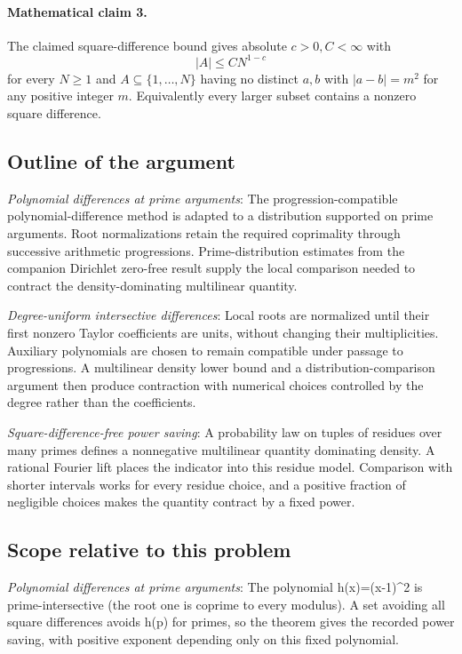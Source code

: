 \documentclass[11pt]{article}
\begin{document}
\paragraph{Mathematical claim 3.} The claimed square-difference bound gives absolute $c>0,C<\infty$ with \[|A|\le CN^{1-c}\] for every $N\ge1$ and $A\subseteq\{1,\ldots,N\}$ having no distinct $a,b$ with $|a-b|=m^2$ for any positive integer $m$. Equivalently every larger subset contains a nonzero square difference.

\subsection{Outline of the argument}
\textit{Polynomial differences at prime arguments}: The progression-compatible polynomial-difference method is adapted to a distribution supported on prime arguments. Root normalizations retain the required coprimality through successive arithmetic progressions. Prime-distribution estimates from the companion Dirichlet zero-free result supply the local comparison needed to contract the density-dominating multilinear quantity.

\textit{Degree-uniform intersective differences}: Local roots are normalized until their first nonzero Taylor coefficients are units, without changing their multiplicities. Auxiliary polynomials are chosen to remain compatible under passage to progressions. A multilinear density lower bound and a distribution-comparison argument then produce contraction with numerical choices controlled by the degree rather than the coefficients.

\textit{Square-difference-free power saving}: A probability law on tuples of residues over many primes defines a nonnegative multilinear quantity dominating density. A rational Fourier lift places the indicator into this residue model. Comparison with shorter intervals works for every residue choice, and a positive fraction of negligible choices makes the quantity contract by a fixed power.

\subsection{Scope relative to this problem}
\textit{Polynomial differences at prime arguments}: The polynomial h(x)=(x-1)\textasciicircum{}2 is prime-intersective (the root one is coprime to every modulus). A set avoiding all square differences avoids h(p) for primes, so the theorem gives the recorded power saving, with positive exponent depending only on this fixed polynomial.
\end{document}
